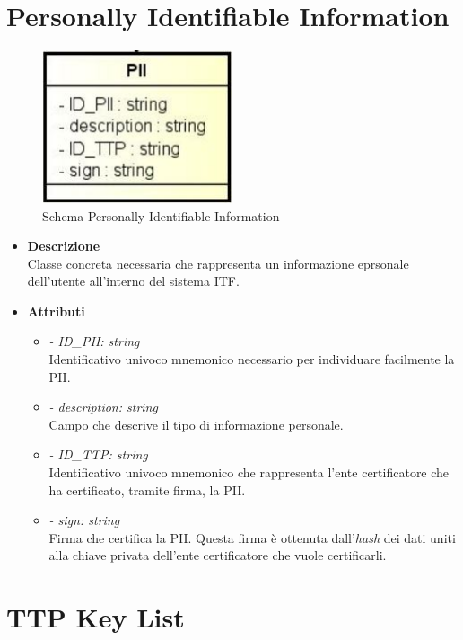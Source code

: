 \section{Personally Identifiable Information}
\begin{figure}[!h]
	\centering
	\includegraphics[width=0.5\textwidth]{immagini/pii}
	\caption{Schema Personally Identifiable Information}
\end{figure}
\begin{itemize}
	\item \textbf{Descrizione}\\
	Classe concreta necessaria che rappresenta un informazione eprsonale dell'utente all'interno del sistema \gls{ITF}.
	\item \textbf{Attributi}\\
	\begin{itemize}
		\item \textit{- ID\_PII: string}\\
		Identificativo univoco mnemonico necessario per individuare facilmente la \gls{PII}.
		\item \textit{- description: string}\\
		Campo che descrive il tipo di informazione personale.
		\item \textit{- ID\_TTP: string}\\
		Identificativo univoco mnemonico che rappresenta l'ente certificatore che ha certificato, tramite firma, la \gls{PII}.
		\item \textit{- sign: string}\\
		Firma che certifica la \gls{PII}. Questa firma è ottenuta dall'\textit{hash} dei dati uniti alla chiave privata dell'ente certificatore che vuole certificarli.
	\end{itemize}
\end{itemize}
\section{TTP Key List}
